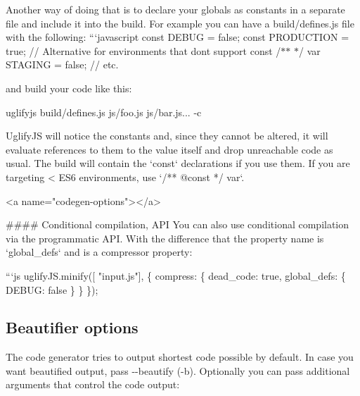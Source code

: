 Another way of doing that is to declare your globals as constants in a separate file and include it into the build. For example you can have a {\ttfamily build/defines.\+js} file with the following\+: ```javascript const D\+E\+B\+UG = false; const P\+R\+O\+D\+U\+C\+T\+I\+ON = true; // Alternative for environments that don\textquotesingle{}t support {\ttfamily const} /$\ast$$\ast$  $\ast$/ var S\+T\+A\+G\+I\+NG = false; // etc. 
\begin{DoxyCode}
and build your code like this:

    uglifyjs build/defines.js js/foo.js js/bar.js... -c

UglifyJS will notice the constants and, since they cannot be altered, it
will evaluate references to them to the value itself and drop unreachable
code as usual.  The build will contain the `const` declarations if you use
them. If you are targeting < ES6 environments, use `/** @const */ var`.

<a name="codegen-options"></a>

#### Conditional compilation, API
You can also use conditional compilation via the programmatic API. With the difference that the
property name is `global\_defs` and is a compressor property:

```js
uglifyJS.minify([ "input.js"], \{
    compress: \{
        dead\_code: true,
        global\_defs: \{
            DEBUG: false
        \}
    \}
\});
\end{DoxyCode}


\subsection*{Beautifier options}

The code generator tries to output shortest code possible by default. In case you want beautified output, pass {\ttfamily -\/-\/beautify} ({\ttfamily -\/b}). Optionally you can pass additional arguments that control the code output\+:


